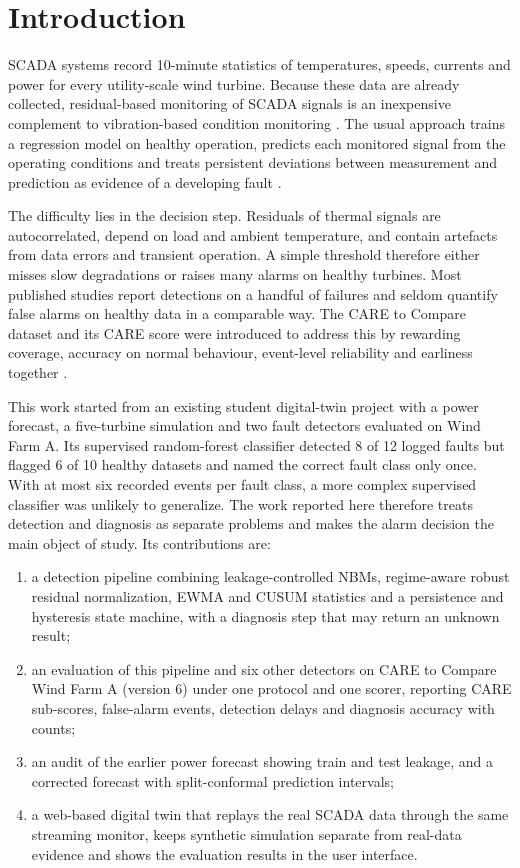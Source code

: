 \documentclass[conference]{IEEEtran}
\begin{document}
\section{Introduction}
SCADA systems record 10-minute statistics of temperatures, speeds, currents and power for every utility-scale wind turbine. Because these data are already collected, residual-based monitoring of SCADA signals is an inexpensive complement to vibration-based condition monitoring \cite{tautzweinert2017review}. The usual approach trains a regression model on healthy operation, predicts each monitored signal from the operating conditions and treats persistent deviations between measurement and prediction as evidence of a developing fault \cite{schlechtingen2011comparative,chesterman2023nbm}.

The difficulty lies in the decision step. Residuals of thermal signals are autocorrelated, depend on load and ambient temperature, and contain artefacts from data errors and transient operation. A simple threshold therefore either misses slow degradations or raises many alarms on healthy turbines. Most published studies report detections on a handful of failures and seldom quantify false alarms on healthy data in a comparable way. The CARE to Compare dataset and its CARE score were introduced to address this by rewarding coverage, accuracy on normal behaviour, event-level reliability and earliness together \cite{gueck2024care}.

This work started from an existing student digital-twin project with a power forecast, a five-turbine simulation and two fault detectors evaluated on Wind Farm A. Its supervised random-forest classifier detected 8 of 12 logged faults but flagged 6 of 10 healthy datasets and named the correct fault class only once. With at most six recorded events per fault class, a more complex supervised classifier was unlikely to generalize. The work reported here therefore treats detection and diagnosis as separate problems and makes the alarm decision the main object of study. Its contributions are:
\begin{enumerate}
\item a detection pipeline combining leakage-controlled NBMs, regime-aware robust residual normalization, EWMA and CUSUM statistics and a persistence and hysteresis state machine, with a diagnosis step that may return an unknown result;
\item an evaluation of this pipeline and six other detectors on CARE to Compare Wind Farm A (version 6) under one protocol and one scorer, reporting CARE sub-scores, false-alarm events, detection delays and diagnosis accuracy with counts;
\item an audit of the earlier power forecast showing train and test leakage, and a corrected forecast with split-conformal prediction intervals;
\item a web-based digital twin that replays the real SCADA data through the same streaming monitor, keeps synthetic simulation separate from real-data evidence and shows the evaluation results in the user interface.
\end{enumerate}
\end{document}

